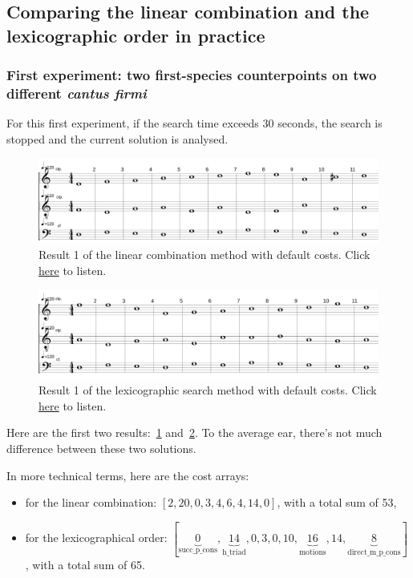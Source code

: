 \subsection{Comparing the linear combination and the lexicographic order in practice}
\subsubsection{First experiment: two first-species counterpoints on two different \textit{cantus firmi}}
For this first experiment, if the search time exceeds 30 seconds, the search is stopped and the current solution is analysed.
\begin{figure}[h]
    \centering
    \includegraphics[width=1\textwidth]{Images/Experiments/linear-combination-1sp.png}
    \caption{Result 1 of the linear combination method with default costs. Click \href{https://youtu.be/w7EQ3b8JHnM}{here} to listen.}
    \label{fig:combili-1sp}
\end{figure}

\begin{figure}[h]
    \centering
    \includegraphics[width=1\textwidth]{Images/Experiments/basic-lexico-1sp.png}
    \caption{Result 1 of the lexicographic search method with default costs. Click \href{https://youtu.be/ryrpi5QNmf0}{here} to listen.}
    \label{fig:lexico-1sp}
\end{figure}

Here are the first two results:~\ref{fig:combili-1sp} and~\ref{fig:lexico-1sp}. To the average ear, there's not much difference between these two solutions.

In more technical terms, here are the cost arrays: 
\begin{itemize}
    \item for the linear combination: $[2, 20, 0, 3, 4, 6, 4, 14, 0]$, with a total sum of 53,
    \item for the lexicographical order: $[\underset{\text{succ\_p\_cons}}{\underbrace{0}}, \underset{\text{h\_triad}}{\underbrace{14}}, 0, 3, 0, 10, \underset{\text{motions}}{\underbrace{16}}, 14, \underset{\text{direct\_m\_p\_cons}}{\underbrace{8}}]$, with a total sum of 65.
\end{itemize}

